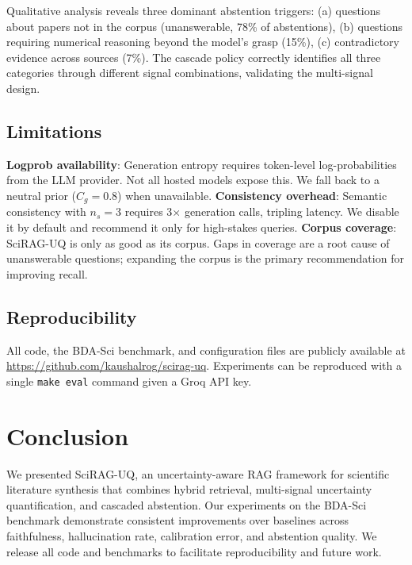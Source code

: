\documentclass[conference]{IEEEtran}
\begin{document}
Qualitative analysis reveals three dominant abstention triggers:
(a) questions about papers not in the corpus (unanswerable, 78\% of abstentions),
(b) questions requiring numerical reasoning beyond the model's grasp (15\%),
(c) contradictory evidence across sources (7\%).
The cascade policy correctly identifies all three categories through different
signal combinations, validating the multi-signal design.

\subsection{Limitations}

\textbf{Logprob availability}: Generation entropy requires token-level
log-probabilities from the LLM provider. Not all hosted models expose this.
We fall back to a neutral prior ($C_g = 0.8$) when unavailable.
\textbf{Consistency overhead}: Semantic consistency with $n_s = 3$ requires
3$\times$ generation calls, tripling latency. We disable it by default and
recommend it only for high-stakes queries.
\textbf{Corpus coverage}: SciRAG-UQ is only as good as its corpus.
Gaps in coverage are a root cause of unanswerable questions; expanding
the corpus is the primary recommendation for improving recall.

\subsection{Reproducibility}

All code, the BDA-Sci benchmark, and configuration files are publicly available
at \url{https://github.com/kaushalrog/scirag-uq}. Experiments can be reproduced
with a single \texttt{make eval} command given a Groq API key.

\section{Conclusion}

We presented SciRAG-UQ, an uncertainty-aware RAG framework for scientific
literature synthesis that combines hybrid retrieval, multi-signal uncertainty
quantification, and cascaded abstention. Our experiments on the BDA-Sci benchmark
demonstrate consistent improvements over baselines across faithfulness,
hallucination rate, calibration error, and abstention quality. We release
all code and benchmarks to facilitate reproducibility and future work.
\end{document}
